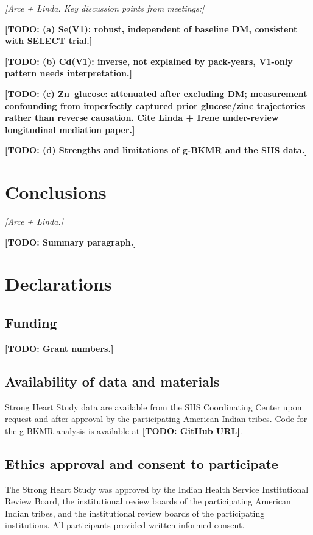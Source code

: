 \documentclass[11pt]{article}
\newcommand{\todo}[1]{{\color{red}\textbf{[TODO: #1]}}}
\newcommand{\note}[1]{{\color{purple}\textit{[#1]}}}
\begin{document}
\note{Arce + Linda. Key discussion points from meetings:}

\todo{(a) Se(V1): robust, independent of baseline DM, consistent with SELECT trial.}

\todo{(b) Cd(V1): inverse, not explained by pack-years, V1-only pattern needs interpretation.}

\todo{(c) Zn--glucose: attenuated after excluding DM; measurement confounding from imperfectly captured prior glucose/zinc trajectories rather than reverse causation. Cite Linda + Irene under-review longitudinal mediation paper.}

\todo{(d) Strengths and limitations of g-BKMR and the SHS data.}

\section{Conclusions}
\label{sec:conclusions}

\note{Arce + Linda.}

\todo{Summary paragraph.}

\section*{Declarations}

\subsection*{Funding}
\todo{Grant numbers.}

\subsection*{Availability of data and materials}
Strong Heart Study data are available from the SHS Coordinating Center upon request and after approval by the participating American Indian tribes. Code for the g-BKMR analysis is available at \todo{GitHub URL}.

\subsection*{Ethics approval and consent to participate}
The Strong Heart Study was approved by the Indian Health Service Institutional Review Board, the institutional review boards of the participating American Indian tribes, and the institutional review boards of the participating institutions. All participants provided written informed consent.
\end{document}
